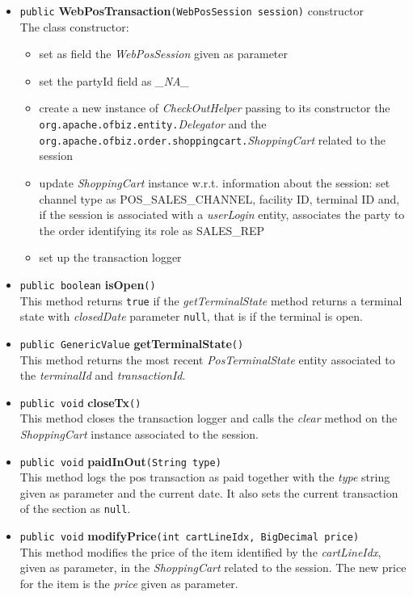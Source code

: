 \begin{itemize}
	\item \texttt{public} \textbf{WebPosTransaction}\texttt{(WebPosSession session)} constructor \\
	The class constructor:
	\begin{itemize}
	 	\item set as field the \emph{WebPosSession} given as parameter
	 	\item set the partyId field as \emph{\_NA\_}
	 	\item create a new instance of \emph{CheckOutHelper} passing to its constructor the \texttt{org.apache.ofbiz.entity.}\emph{Delegator} and the \\ \texttt{org.apache.ofbiz.order.shoppingcart.}\emph{ShoppingCart} related to the session
	 	\item update \emph{ShoppingCart} instance w.r.t. information about the session: set channel type as POS\_SALES\_CHANNEL, facility ID, terminal ID and, if the session is associated with a \emph{userLogin} entity, associates the party to the order identifying its role as SALES\_REP
	 	\item set up the transaction logger
	 \end{itemize}
	\item \texttt{public boolean} \textbf{isOpen}\texttt{()} \\
This method returns \texttt{true} if the \emph{getTerminalState} method returns a terminal state  with \textit{closedDate} parameter \texttt{null}, that is if the terminal is open.
	\item \texttt{public GenericValue} \textbf{getTerminalState}\texttt{()} \\This method returns the most recent \emph{PosTerminalState} entity associated to the \emph{terminalId} and \emph{transactionId}.
	\item \texttt{public void} \textbf{closeTx}\texttt{()} \\ This method closes the transaction logger and calls the \emph{clear} method on the \textit{ShoppingCart} instance associated to the session.
   \item \texttt{public void} \textbf{paidInOut}\texttt{(String type)} \\ This method logs the pos transaction as paid together with the \emph{type} string given as parameter and the current date. It also sets the current transaction of the section as \texttt{null}.
   \item \texttt{public void} \textbf{modifyPrice}\texttt{(int cartLineIdx, BigDecimal price)} \\ This method modifies the price of the item identified by the \emph{cartLineIdx}, given as parameter, in the \emph{ShoppingCart} related to the session. The new price for the item is the \emph{price} given as parameter.

\end{itemize}
